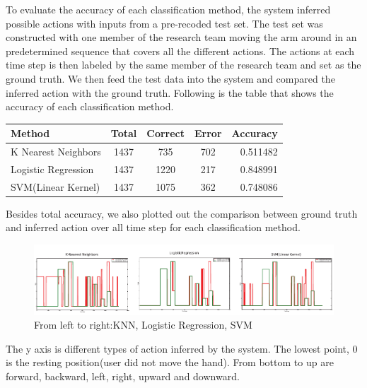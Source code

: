 To evaluate the accuracy of each classification method, the system inferred possible actions with inputs from a pre-recoded test set. The test set was constructed with one member of the research team moving the arm around in an predetermined sequence that covers all the different actions. The actions at each time step is then labeled by the same member of the research team and set as the ground truth. We then feed the test data into the system and compared the inferred action with the ground truth. Following is the table that shows the accuracy of each classification method.
\begin{center}
\begin{tabular}{|l|c|c|c|r|}
\hline
Method & Total & Correct & Error & Accuracy\\ \hline
K Nearest Neighbors & 1437 & 735 & 702 & 0.511482 \\ \hline
Logistic Regression & 1437 & 1220 & 217 & 0.848991 \\ \hline
SVM(Linear Kernel) & 1437 & 1075 & 362 & 0.748086 \\ \hline
\end{tabular}
\end{center}
Besides total accuracy, we also plotted out the comparison between ground truth and inferred action over all time step for each classification method.
\begin{figure}[H]
  \centering
    \includegraphics[width=\textwidth]{graph2}
  \caption{From left to right:KNN, Logistic Regression, SVM}
  \label{fig:sys}
\end{figure}
The y axis is different types of action inferred by the system. The lowest point, 0 is the resting position(user did not move the hand). From bottom to up are forward, backward, left, right, upward and downward.

